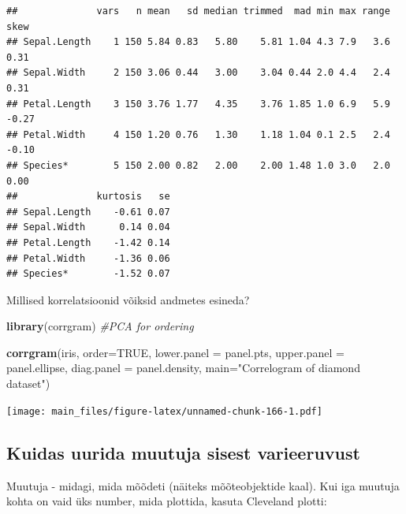 \documentclass[]{book}
\newenvironment{Shaded}{\begin{snugshade}}{\end{snugshade}}
\newcommand{\KeywordTok}[1]{\textcolor[rgb]{0.13,0.29,0.53}{\textbf{#1}}}
\newcommand{\DataTypeTok}[1]{\textcolor[rgb]{0.13,0.29,0.53}{#1}}
\newcommand{\StringTok}[1]{\textcolor[rgb]{0.31,0.60,0.02}{#1}}
\newcommand{\CommentTok}[1]{\textcolor[rgb]{0.56,0.35,0.01}{\textit{#1}}}
\newcommand{\OtherTok}[1]{\textcolor[rgb]{0.56,0.35,0.01}{#1}}
\newcommand{\NormalTok}[1]{#1}
\begin{document}
\begin{verbatim}
##              vars   n mean   sd median trimmed  mad min max range  skew
## Sepal.Length    1 150 5.84 0.83   5.80    5.81 1.04 4.3 7.9   3.6  0.31
## Sepal.Width     2 150 3.06 0.44   3.00    3.04 0.44 2.0 4.4   2.4  0.31
## Petal.Length    3 150 3.76 1.77   4.35    3.76 1.85 1.0 6.9   5.9 -0.27
## Petal.Width     4 150 1.20 0.76   1.30    1.18 1.04 0.1 2.5   2.4 -0.10
## Species*        5 150 2.00 0.82   2.00    2.00 1.48 1.0 3.0   2.0  0.00
##              kurtosis   se
## Sepal.Length    -0.61 0.07
## Sepal.Width      0.14 0.04
## Petal.Length    -1.42 0.14
## Petal.Width     -1.36 0.06
## Species*        -1.52 0.07
\end{verbatim}

Millised korrelatsioonid võiksid andmetes esineda?

\begin{Shaded}
\begin{Highlighting}[]
\KeywordTok{library}\NormalTok{(corrgram) }\CommentTok{#PCA for ordering}

\KeywordTok{corrgram}\NormalTok{(iris, }\DataTypeTok{order=}\OtherTok{TRUE}\NormalTok{, }
         \DataTypeTok{lower.panel =}\NormalTok{ panel.pts,}
         \DataTypeTok{upper.panel =}\NormalTok{ panel.ellipse,}
         \DataTypeTok{diag.panel =}\NormalTok{ panel.density,}
         \DataTypeTok{main=}\StringTok{"Correlogram of diamond dataset"}\NormalTok{)}
\end{Highlighting}
\end{Shaded}

\texttt{[image: main\_files/figure-latex/unnamed-chunk-166-1.pdf]}

\subsection{Kuidas uurida muutuja sisest
varieeruvust}\label{kuidas-uurida-muutuja-sisest-varieeruvust}

Muutuja - midagi, mida mõõdeti (näiteks mõõteobjektide kaal). Kui iga
muutuja kohta on vaid üks number, mida plottida, kasuta Cleveland
plotti:
\end{document}

